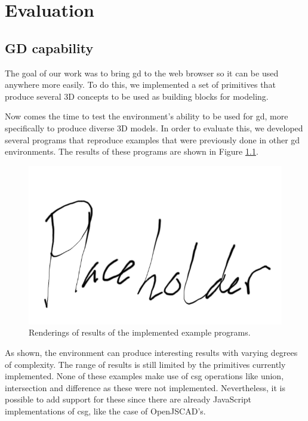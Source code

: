 
\chapter{Evaluation}
\label{chapter:evaluation}




\section{GD capability}
The goal of our work was to bring \gls{gd} to the web browser so it can be used anywhere more easily.
To do this, we implemented a set of primitives that produce several 3D concepts to be used as building blocks for modeling.

Now comes the time to test the environment's ability to be used for \gls{gd}, more specifically to produce diverse 3D models.
In order to evaluate this, we developed several programs that reproduce examples that were previously done in other \gls{gd} environments.
The results of these programs are shown in Figure \ref{fig:all:examples}.

\begin{figure}
  \centering
  \includegraphics[width=12cm]{./images/all_examples}
  \caption{Renderings of results of the implemented example programs.}
  \label{fig:all:examples}
\end{figure}

As shown, the environment can produce interesting results with varying degrees of complexity.
The range of results is still limited by the primitives currently implemented.
None of these examples make use of \gls{csg} operations like union, intersection and difference as these were not implemented.
Nevertheless, it is possible to add support for these since there are already JavaScript implementations of \gls{csg}, like the case of OpenJSCAD's.


